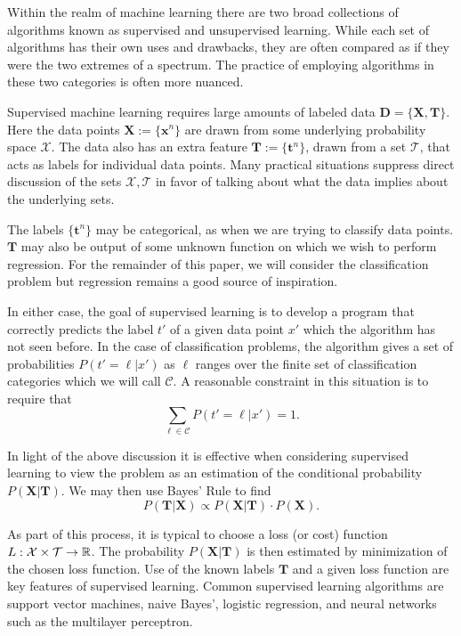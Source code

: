 \label{supVunsup}
Within the realm of machine learning there are two broad collections of 
algorithms known as supervised and unsupervised learning. While each set of 
algorithms has their own uses and drawbacks, they are often compared as if 
they were the two extremes of a spectrum. The practice of employing algorithms 
in these two categories is often more nuanced.

Supervised machine learning requires large amounts of labeled data 
$\bm{D}=\{\bm{X},\bm{T}\}$.  Here the data points \( \bm X :=\{\bm x^{n}\}\) are drawn from some underlying probability space \( \mathcal{X} \). The data also has an extra feature 
$\bm{T}:=\{\bm t^n\}$, drawn from a set \( \mathcal{T} \), that acts as labels for individual data points. Many practical situations suppress direct discussion of the sets \( \mathcal{X},\mathcal{T} \) in favor of talking about what the data implies about the underlying sets.

The labels \(\{\bm t^n\}\) may be categorical, as when we are trying to classify data points.  
$\bm{T}$ may also be output of some unknown function on which we wish to 
perform regression. For the remainder of this paper, we will consider the 
classification problem but regression remains a good source of inspiration.

In either case, the goal of supervised learning is to develop a program that
correctly predicts the label $t'$ of a given data point $x'$ which the algorithm has not seen before. In the case of classification problems, the algorithm gives a set of 
probabilities $P(t'=\ell|x')$ as $\ell$ ranges over the finite set of 
classification categories which we will call $\mathcal{C}$. A reasonable 
constraint in this situation is to require that 
\[\sum_{\ell\in\mathcal{C}}P(t'=\ell|x') = 1.\]

In light of the above discussion it is effective when considering supervised 
learning to view the problem as an estimation of the conditional probability 
$P(\bm{X}|\bm{T})$. We may then use Bayes' Rule to find 
\[P(\bm T|\bm X)\propto P(\bm X|\bm T)\cdot P(\bm X).\]


As part of this process, it is typical to choose a loss (or cost) function 
$L:\mathcal{X}\times\mathcal{T}\rightarrow \mathbb R$.  The probability 
$P(\bm{X}|\bm{T})$ is then estimated by minimization of the chosen 
loss function. Use of the known labels \( \bm T \) and a given loss function are key features of supervised learning. Common supervised learning algorithms are support vector machines, naive Bayes', logistic regression, and  neural networks such as the multilayer perceptron.


